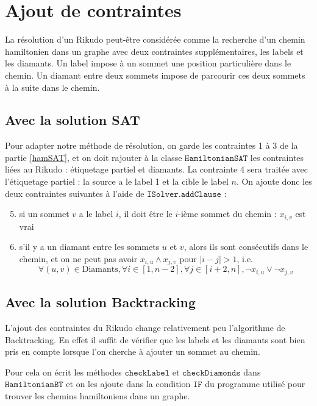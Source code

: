 \documentclass[11pt, a4paper]{article}
\begin{document}
\section{Ajout de contraintes}

La résolution d'un Rikudo peut-être considérée comme la recherche d'un chemin hamiltonien dans un graphe avec deux contraintes supplémentaires, les labels et les diamants. Un label impose à un sommet une position particulière dans le chemin. Un diamant entre deux sommets impose de parcourir ces deux sommets à la suite dans le chemin. 

\subsection{Avec la solution SAT}

Pour adapter notre méthode de résolution, on garde les contraintes 1 à 3 de la partie \ref{hamSAT}, et on doit rajouter à la classe $\mathtt{HamiltonianSAT}$ les contraintes liées au Rikudo : étiquetage partiel et diamants. La contrainte 4 sera traitée avec l'étiquetage partiel : la source a le label 1 et la cible le label $n$. On ajoute donc les deux contraintes suivantes à l'aide de $\mathtt{ISolver.addClause}$ :
\begin{enumerate}
	\setcounter{enumi}{4}
	\item si un sommet $v$ a le label $i$, il doit être le $i$-ième sommet du chemin : $x_{i, v}$ est vrai
	\item s'il y a un diamant entre les sommets $u$ et $v$, alors ils sont consécutifs dans le chemin, et on ne peut pas avoir $x_{i, u} \land x_{j, v}$ pour $|i - j| > 1$, i.e.
	\[\forall (u, v)\in\mathrm{Diamants}, \forall i\in[1, n-2], \forall j\in[i + 2, n], \neg x_{i, u}\lor \neg x_{j, v}\]
\end{enumerate}

\subsection{Avec la solution Backtracking}


L'ajout des contraintes du Rikudo change relativement peu l'algorithme de Backtracking. En effet il suffit de vérifier que les labels et les diamants sont bien pris en compte lorsque l'on cherche à ajouter un sommet au chemin. 

Pour cela on écrit les méthodes $\mathtt{checkLabel}$ et $\mathtt{checkDiamonds}$ dans $\mathtt{HamiltonianBT}$ et on les ajoute dans la condition $\mathtt{IF}$ du programme utilisé pour trouver les chemins hamiltoniens dans un graphe. 
\end{document}

